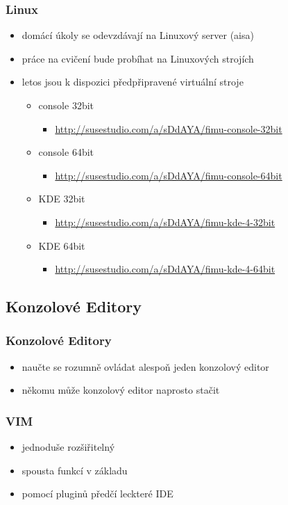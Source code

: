 \begin{frame}
\frametitle{Linux}
	\begin{itemize}
		\item{domácí úkoly se odevzdávají na Linuxový server (aisa)}
		\item{práce na cvičení bude probíhat na Linuxových strojích}
		\item{letos jsou k dispozici předpřipravené virtuální stroje}
		\begin{itemize}
			\item{console 32bit}
			\begin{itemize}
				\item{\url{http://susestudio.com/a/sDdAYA/fimu-console-32bit}}
			\end{itemize}
			\item{console 64bit}
			\begin{itemize}
				\item{\url{http://susestudio.com/a/sDdAYA/fimu-console-64bit}}
			\end{itemize}
			\item{KDE 32bit}
			\begin{itemize}
				\item{\url{http://susestudio.com/a/sDdAYA/fimu-kde-4-32bit}}
			\end{itemize}
			\item{KDE 64bit}
			\begin{itemize}
				\item{\url{http://susestudio.com/a/sDdAYA/fimu-kde-4-64bit}}
			\end{itemize}
		\end{itemize}
	\end{itemize}
\end{frame}

	\subsection{Konzolové Editory}

	\begin{frame}
		\frametitle{Konzolové Editory}
		\begin{itemize}
			\item{naučte se rozumně ovládat alespoň jeden konzolový editor}
			\item{někomu může konzolový editor naprosto stačit}
		\end{itemize}
	\end{frame}

	\begin{frame}
		\frametitle{VIM}
		\begin{itemize}
			\item{jednoduše rozšiřitelný}
			\item{spousta funkcí v základu}
			\item{pomocí pluginů předčí leckteré IDE}
		\end{itemize}
	\end{frame}

